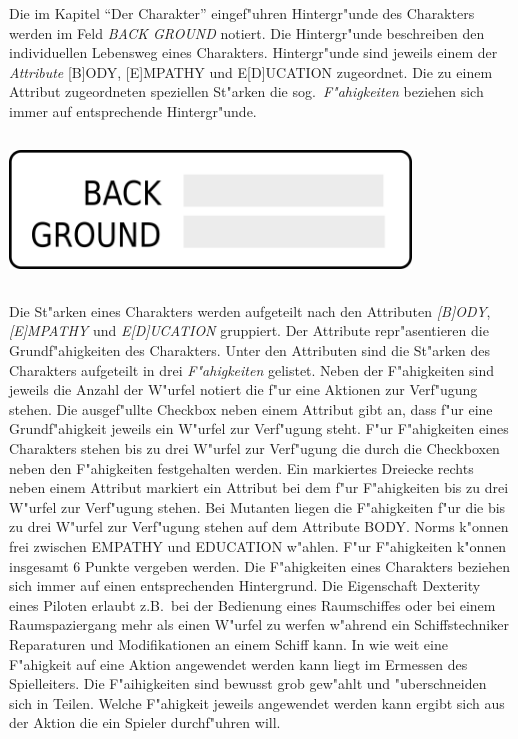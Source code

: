 \begin{column}[l]{0.52}
    Die im Kapitel "`Der Charakter"' eingef"uhren Hintergr"unde des Charakters werden im Feld \emph{BACK GROUND} notiert. Die Hintergr"unde beschreiben den individuellen Lebensweg eines Charakters. Hintergr"unde sind jeweils einem der \emph{Attribute} [B]ODY, [E]MPATHY und E[D]UCATION zugeordnet. Die zu einem Attribut zugeordneten speziellen St"arken die sog.~\emph{F"ahigkeiten} beziehen sich immer auf entsprechende Hintergr"unde.
\end{column}
\begin{column}[r]{0.48}
    \centering
    \includegraphics[width=0.80\textwidth]{images/character_background.png}    
\end{column}

Die St"arken eines Charakters werden aufgeteilt nach den Attributen \emph{[B]ODY}, \emph{[E]MPATHY} und \emph{E[D]UCATION} gruppiert. Der Attribute repr"asentieren die Grundf"ahigkeiten des Charakters. Unter den Attributen sind die St"arken des Charakters aufgeteilt in drei \emph{F"ahigkeiten} gelistet. Neben der F"ahigkeiten sind jeweils die Anzahl der W"urfel notiert die f"ur eine Aktionen zur Verf"ugung stehen. Die ausgef"ullte Checkbox neben einem Attribut gibt an, dass f"ur eine Grundf"ahigkeit jeweils ein W"urfel zur Verf"ugung steht. F"ur F"ahigkeiten eines Charakters stehen bis zu drei W"urfel zur Verf"ugung die durch die Checkboxen neben den F"ahigkeiten festgehalten werden. Ein markiertes Dreiecke rechts neben einem Attribut markiert ein Attribut bei dem f"ur F"ahigkeiten bis zu drei W"urfel zur Verf"ugung stehen. Bei Mutanten liegen die F"ahigkeiten f"ur die bis zu drei W"urfel zur Verf"ugung stehen auf dem Attribute BODY. Norms k"onnen frei zwischen EMPATHY und EDUCATION w"ahlen. F"ur F"ahigkeiten k"onnen insgesamt 6 Punkte vergeben werden.
Die F"ahigkeiten eines Charakters beziehen sich immer auf einen entsprechenden Hintergrund. Die Eigenschaft Dexterity eines Piloten erlaubt z.B.~bei der Bedienung eines Raumschiffes oder bei einem Raumspaziergang mehr als einen W"urfel zu werfen w"ahrend ein Schiffstechniker Reparaturen und Modifikationen an einem Schiff kann. In wie weit eine F"ahigkeit auf eine Aktion angewendet werden kann liegt im Ermessen des Spielleiters. Die F"aihigkeiten sind bewusst grob gew"ahlt und "uberschneiden sich in Teilen. Welche F"ahigkeit jeweils angewendet werden kann ergibt sich aus der Aktion die ein Spieler durchf"uhren will.

